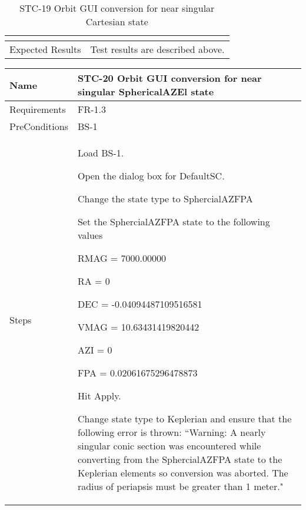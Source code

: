 \begin{table}[htbp!]
\begin{tabular}{|p{1.05 in} |p{4.75 in} |}
\begin{compactenum}
         \end{compactenum}
         \\ \hline
         Expected Results & Test results are described above.\\
      \hline
      \end{tabular}
      \label{Table:STC-19}
      \caption{STC-19 Orbit GUI conversion for near singular Cartesian state}
\end{table}


\begin{table}[htbp!]
\centering
      \begin{tabular}{|p{1.05 in} |p{4.75 in} |}
      \hline
         \rowcolor[rgb]{0.8,0.8,0.8} Name & STC-20 Orbit GUI conversion for near singular SphericalAZEl state \\
         \hline
         Requirements & FR-1.3\\  \hline
         PreConditions & BS-1\\     \hline
        Steps &
         \begin{compactenum}
             \item Load BS-1.
             \item Open the dialog box for DefaultSC.
             \item Change the state type to SphercialAZFPA
             \item Set the SphercialAZFPA state to the following values
                 \begin{compactenum}
                    \item RMAG  = 7000.00000
                    \item RA = 0
                    \item DEC = -0.04094487109516581
                    \item VMAG = 10.63431419820442
                    \item AZI = 0
                    \item FPA = 0.02061675296478873
                    \end{compactenum}
             \item Hit Apply.
             \item Change state type to Keplerian and ensure that the following error is thrown: ``Warning: A nearly singular conic section was encountered while converting from the SphercialAZFPA state to the Keplerian elements so conversion was aborted.  The radius of periapsis must be greater than 1 meter."

\end{compactenum}
\end{tabular}
\end{table}
